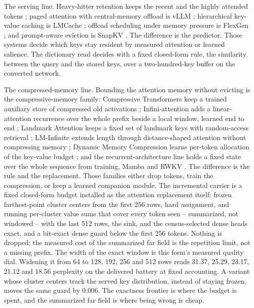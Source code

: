 \documentclass[11pt]{article}
\begin{document}
The serving line. Heavy-hitter retention keeps the recent and the
highly attended tokens \cite{h2o2023}; paged attention with
central-memory offload is vLLM \cite{vllm2023}; hierarchical
key-value caching is LMCache \cite{lmcache2024}; offload scheduling
under memory pressure is FlexGen \cite{flexgen2023}; and
prompt-aware eviction is SnapKV \cite{snapkv2024}. The difference
is the predictor. Those systems decide which keys stay resident by
measured attention or learned salience. The dictionary read decides
with a fixed closed-form rule, the similarity between the query and
the stored keys, over a two-hundred-key buffer on the converted
network.

The compressed-memory line. Bounding the attention memory
without evicting is the compressive-memory family: Compressive
Transformers keep a trained auxiliary store of compressed old
activations \cite{rae2020}; Infini-attention adds a
linear-attention recurrence over the whole prefix beside a
local window, learned end to end \cite{munkhdalai2024};
Landmark Attention keeps a fixed set of landmark keys with
random-access retrieval \cite{mohtashami2023}; LM-Infinite
extends length through distance-shaped attention without
compressing memory \cite{han2023}; Dynamic Memory Compression
learns per-token allocation of the key-value budget
\cite{nawrot2024}; and the recurrent-architecture line holds a
fixed state over the whole sequence from training, Mamba and
RWKV \cite{gu2023mamba, peng2023rwkv}. The difference is the
rule and the replacement. Those families either drop tokens,
train the compression, or keep a learned companion module. The
incremental carrier is a fixed closed-form budget installed as
the attention replacement itself: frozen farthest-point cluster
centers from the first 256 rows, hard assignment, and running
per-cluster value sums that cover every token seen --
summarized, not windowed -- with the last 512 rows, the sink,
and the census-selected dense heads exact, and a bit-exact
dense guard below the first 256 tokens. Nothing is dropped; the
measured cost of the summarized far field is the repetition
limit, not a missing prefix. The width of the exact window is
this form's measured quality dial. Widening it from 64 to 128,
192, 256 and 512 rows reads 31.37, 25.29, 23.17, 21.12 and
18.56 perplexity on the delivered battery at fixed accounting.
A variant whose cluster centers track the served key
distribution, instead of staying frozen, moves the same guard
by 0.006. The exactness frontier is where the budget is spent,
and the summarized far field is where being wrong is cheap.
\end{document}
